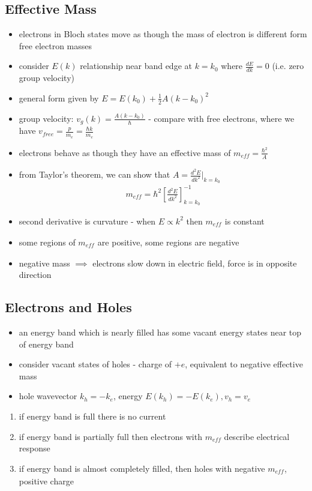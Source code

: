\documentclass[a4paper,11pt,normalem]{article}
\begin{document}
\subsection{Effective Mass}

\begin{itemize}
    \item electrons in Bloch states move as though the mass of electron is different form free electron masses
    \item consider \(E(k)\) relationship near band edge at \(k = k_0\) where \(\frac{dE}{dk} = 0\) (i.e. zero group velocity)
    \item general form given by \(E = E(k_0) + \frac{1}{2}A(k - k_0)^2\)
    \item group velocity: \(v_g(k) = \frac{A(k-k_0)}{\hbar}\) - compare with free electrons, where we have \(v_{free} = \frac{p}{m_e} = \frac{\hbar k}{m_e}\)
    \item electrons behave as though they have an effective mass of \(m_{eff} = \frac{\hbar^2}{A_{}}\)
    \item from Taylor's theorem, we can show that \(A = \frac{d^2E}{dk^2}\Big|_{k=k_0}\)
        \begin{align*}
            m_{eff} = \hbar^2\left[\frac{d^2E}{dk^2}\right]^{-1}_{k=k_0}
        \end{align*}
    \item second derivative is curvature - when \(E \propto k^2\) then \(m_{eff_{}}\) is constant
    \item some regions of \(m_{eff_{}}\) are positive, some regions are negative
    \item negative mass \(\implies\) electrons slow down in electric field, force is in opposite direction
\end{itemize}

\subsection{Electrons and Holes}

\begin{itemize}
    \item an energy band which is nearly filled has some vacant energy states near top of energy band
    \item consider vacant states of holes - charge of \(+e\), equivalent to negative effective mass
    \item hole wavevector \(k_h = -k_e\), energy \(E(k_h) = - E(k_e), v_h = v_e\)
\end{itemize}

\begin{enumerate}
    \item if energy band is full there is no current
    \item if energy band is partially full then electrons with $m_{eff}$ describe electrical response
    \item if energy band is almost completely filled, then holes with negative \(m_{eff_{}}\), positive charge
\end{enumerate}
\end{document}
